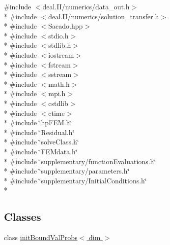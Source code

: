 {\ttfamily \#include $<$deal.\-I\-I/numerics/data\-\_\-out.\-h$>$}\\*
{\ttfamily \#include $<$deal.\-I\-I/numerics/solution\-\_\-transfer.\-h$>$}\\*
{\ttfamily \#include $<$Sacado.\-hpp$>$}\\*
{\ttfamily \#include $<$stdio.\-h$>$}\\*
{\ttfamily \#include $<$stdlib.\-h$>$}\\*
{\ttfamily \#include $<$iostream$>$}\\*
{\ttfamily \#include $<$fstream$>$}\\*
{\ttfamily \#include $<$sstream$>$}\\*
{\ttfamily \#include $<$math.\-h$>$}\\*
{\ttfamily \#include $<$mpi.\-h$>$}\\*
{\ttfamily \#include $<$cstdlib$>$}\\*
{\ttfamily \#include $<$ctime$>$}\\*
{\ttfamily \#include \char`\"{}hp\-F\-E\-M.\-h\char`\"{}}\\*
{\ttfamily \#include \char`\"{}Residual.\-h\char`\"{}}\\*
{\ttfamily \#include \char`\"{}solve\-Class.\-h\char`\"{}}\\*
{\ttfamily \#include \char`\"{}F\-E\-Mdata.\-h\char`\"{}}\\*
{\ttfamily \#include \char`\"{}supplementary/function\-Evaluations.\-h\char`\"{}}\\*
{\ttfamily \#include \char`\"{}supplementary/parameters.\-h\char`\"{}}\\*
{\ttfamily \#include \char`\"{}supplementary/\-Initial\-Conditions.\-h\char`\"{}}\\*
\subsection*{Classes}
\begin{DoxyCompactItemize}
\item 
class \hyperlink{classinit_bound_val_probs}{init\-Bound\-Val\-Probs$<$ dim $>$}
\end{DoxyCompactItemize}
